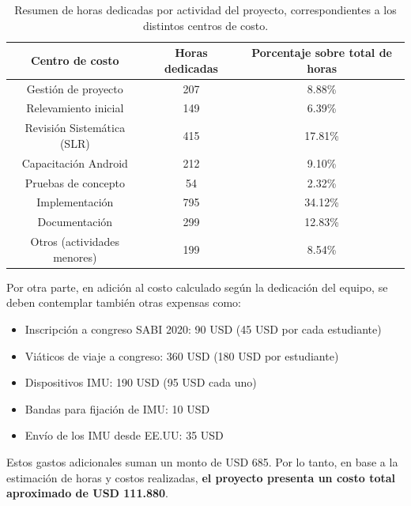 \begin{table}[H]
\caption{Resumen de horas dedicadas por actividad del proyecto, correspondientes a los distintos centros de costo.}
\centering
\hspace*{-2.5cm}%
\begin{tabular}{|c|c|c|}
\hline
\textbf{Centro de costo} & \textbf{Horas dedicadas} & \textbf{Porcentaje sobre total de horas} \\ \hline
Gestión de proyecto & 207 & 8.88\% \\ \hline
Relevamiento inicial & 149 & 6.39\% \\ \hline
Revisión Sistemática (SLR) & 415 & 17.81\% \\ \hline
Capacitación Android & 212 & 9.10\% \\ \hline
Pruebas de concepto	& 54 & 2.32\% \\ \hline
Implementación & 795 & 34.12\% \\ \hline
Documentación & 299 & 12.83\% \\ \hline
Otros (actividades menores) & 199 & 8.54\% \\ \hline
\end{tabular}
\hspace*{-1cm}
\label{TAB:dedication-per-center}
\end{table}


Por otra parte, en adición al costo calculado según la dedicación del equipo, se deben contemplar también otras expensas como: 

\begin{itemize}
    \item Inscripción a congreso SABI 2020: 90 USD (45 USD por cada estudiante)
    \item Viáticos de viaje a congreso: 360 USD (180 USD por estudiante)
    \item Dispositivos IMU: 190 USD (95 USD cada uno) 
    \item Bandas para fijación de IMU: 10 USD
    \item Envío de los IMU desde EE.UU: 35 USD
\end{itemize}

Estos gastos adicionales suman un monto de USD 685. Por lo tanto, en base a la estimación de horas y costos realizadas, \textbf{el proyecto presenta un costo total aproximado de USD 111.880}.

